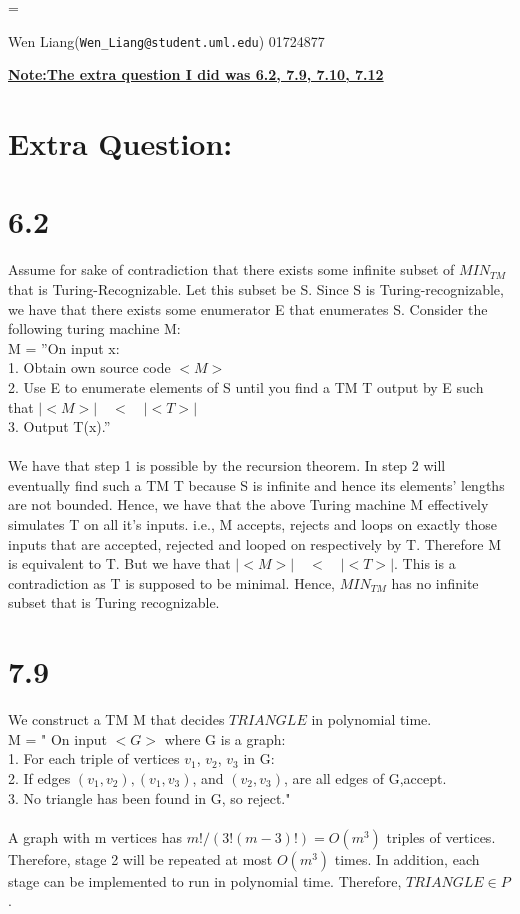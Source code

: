 \documentclass{scrartcl}
\begin{document}
\hfuzz=\maxdimen
{}
\begin{center}
Wen Liang(\texttt{Wen\_Liang@student.uml.edu}) 01724877

\end{center}
\textbf{\underline{Note:The extra question I did was 6.2, 7.9, 7.10, 7.12}}
\section*{Extra Question:}
\section*{6.2}
Assume for sake of contradiction that there exists some infinite subset of
$MIN_{TM}$ that is Turing-Recognizable. Let this subset be S. Since S is Turing-recognizable, we have that there exists some enumerator E that
enumerates S. Consider the following turing machine M:
\\
M = ”On input x:\\
1. Obtain own source code $<M>$\\
2. Use E to enumerate elements of S until you find a TM T output by E such that
$\mid<M>\mid\quad  < \quad\mid<T>\mid$ \\
3. Output T(x).”\\
\\
We have that step 1 is possible by the recursion theorem. In step 2 will eventually
find such a TM T because S is infinite and hence its elements’ lengths are not bounded.
Hence, we have that the above Turing machine M effectively simulates T on all it’s
inputs. i.e., M accepts, rejects and loops on exactly those inputs that are accepted,
rejected and looped on respectively by T. Therefore M is equivalent to T.  But we have
that $\mid<M>\mid\quad < \quad\mid<T>\mid$. This is a contradiction as T is supposed to be minimal. Hence, $MIN_{TM}$ has no infinite subset that is Turing recognizable.


\section*{7.9}

We construct a TM M that decides $TRIANGLE$ in polynomial time.\\
M = " On input $<G>$ where G is a graph:\\
1. For each triple of vertices $v_1$, $v_2$, $v_3$ in G:\\
2. \qquad If edges $(v_1, v_2), (v_1, v_3)$, and $(v_2, v_3)$, are all edges of G,accept.\\
3. No triangle has been found in G, so reject."\\
\\
A graph with m vertices has $m!/(3!(m-3)!) = O(m^3)$ triples of vertices. Therefore, stage 2 will be repeated at most $O(m^3)$ times. In addition, each stage can be implemented to run in polynomial time. Therefore, $TRIANGLE \in P$.
\end{document}
